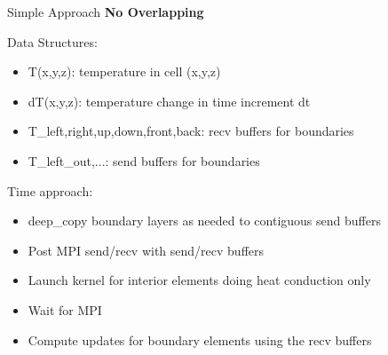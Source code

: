 \begin{comment}
\begin{frame}{Example - 3D Heat Equations}
  \textbf{Heat Source / Sink defined through the boundary conditions}
   \begin{itemize}
      \item Using surface black body thermal radiation as heat sink
      \begin{itemize}
        \item Using A as surface area of an element (its zero for all bulk elements)
      \end{itemize}
      \item Using a constant power density as heat source on one surface
      \begin{itemize}
        \item Turn the power of mid run.
        \item Use Ax as surface area exposed to the heat source
      \end{itemize}
   \end{itemize}
   \begin{align*}
      f(t_n) = -A_{ijk}*sigma*u^4 + Ax_{ijk}*P(t_n)
   \end{align*}
\end{frame}
\end{comment}

\begin{frame}{Simple Approach}
   \textbf{No Overlapping}

Data Structures:
\begin{itemize}
  \item T(x,y,z): temperature in cell (x,y,z)
  \item dT(x,y,z): temperature change in time increment dt
  \item T\_{left,right,up,down,front,back}: recv buffers for boundaries
  \item T\_{left\_out,...}: send buffers for boundaries
\end{itemize}

Time approach:
\begin{itemize}
  \item deep\_copy boundary layers as needed to contiguous send buffers
  \item Post MPI send/recv with send/recv buffers
  \item Launch kernel for interior elements doing heat conduction only
  \item Wait for MPI
  \item Compute updates for boundary elements using the recv buffers
\end{itemize}
\end{frame}

